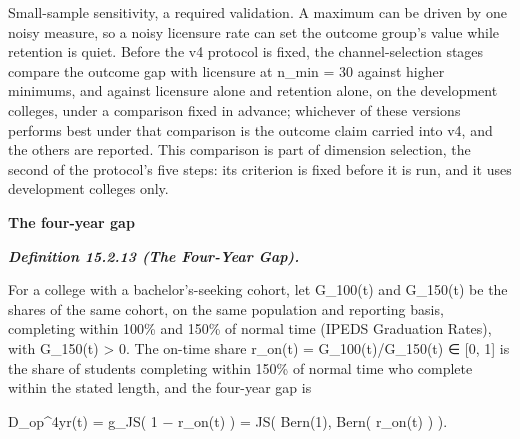 \documentclass[
]{article}
\begin{document}
Small-sample sensitivity, a required validation. A maximum can be driven
by one noisy measure, so a noisy licensure rate can set the outcome
group's value while retention is quiet. Before the v4 protocol is fixed,
the channel-selection stages compare the outcome gap with licensure at
n\_min = 30 against higher minimums, and against licensure alone and
retention alone, on the development colleges, under a comparison fixed
in advance; whichever of these versions performs best under that
comparison is the outcome claim carried into v4, and the others are
reported. This comparison is part of dimension selection, the second of
the protocol's five steps: its criterion is fixed before it is run, and
it uses development colleges only.

\textbf{The four-year gap}

\emph{\textbf{Definition 15.2.13 (The Four-Year Gap).}}

For a college with a bachelor's-seeking cohort, let G\_100(t) and
G\_150(t) be the shares of the same cohort, on the same population and
reporting basis, completing within 100\% and 150\% of normal time (IPEDS
Graduation Rates), with G\_150(t) \textgreater{} 0. The on-time share
r\_on(t) = G\_100(t)/G\_150(t) ∈ {[}0, 1{]} is the share of students
completing within 150\% of normal time who complete within the stated
length, and the four-year gap is

D\_op\^{}4yr(t) = g\_JS( 1 − r\_on(t) ) = JS( Bern(1), Bern( r\_on(t) )
).
\end{document}
